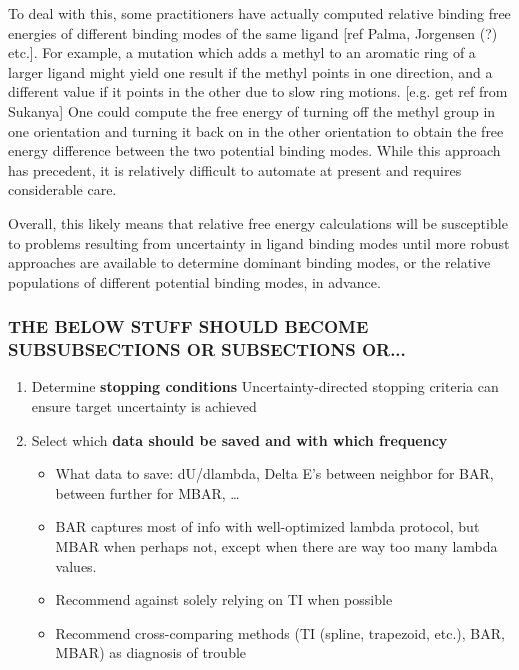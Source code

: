 \documentclass[9pt,bestpractices]{livecoms}
\begin{document}
To deal with this, some practitioners have actually computed relative binding free energies of different binding modes of the same ligand [ref Palma, Jorgensen (?) etc.].
For example, a mutation which adds a methyl to an aromatic ring of a larger ligand might yield one result if the methyl points in one direction, and a different value if it points in the other due to slow ring motions. [e.g. get ref from Sukanya]
One could compute the free energy of turning off the methyl group in one orientation and turning it back on in the other orientation to obtain the free energy difference between the two potential binding modes.
While this approach has precedent, it is relatively difficult to automate at present and requires considerable care.

Overall, this likely means that relative free energy calculations will be susceptible to problems resulting from uncertainty in ligand binding modes until more robust approaches are available to determine dominant binding modes, or the relative populations of different potential binding modes, in advance.


\subsubsection{THE BELOW STUFF SHOULD BECOME SUBSUBSECTIONS OR SUBSECTIONS OR...}

\begin{enumerate}
\item Determine \textbf{stopping conditions}
Uncertainty-directed stopping criteria can ensure target uncertainty is achieved


\item Select which \textbf{data should be saved and with which frequency}
\begin{itemize}
\item What data to save: dU/dlambda, Delta E’s between neighbor for BAR, between further for MBAR, …
\item BAR captures most of info with well-optimized lambda protocol, but MBAR when perhaps not, except when there are way too many lambda values.
\item Recommend against solely relying on TI when possible
\item Recommend cross-comparing methods (TI (spline, trapezoid, etc.), BAR, MBAR) as diagnosis of trouble
\end{itemize}

\end{enumerate}
\end{document}
